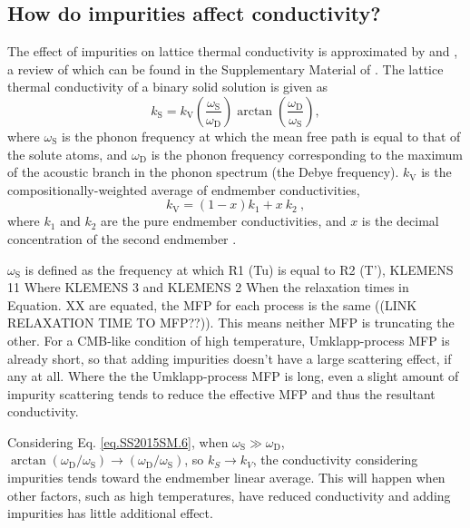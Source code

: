 \subsection{How do impurities affect conductivity?} 
\label{impur_theory}

The effect of impurities on lattice thermal conductivity is approximated by \citet{Klemens1960} and \citet{Padture1997}, a review of which can be found in the Supplementary Material of \citet{Stackhouse2015}. The lattice thermal conductivity of a binary solid solution is given \citep[in][Eq. S6]{Stackhouse2015} as
%
\begin{equation}
k_{\mathrm{S}}=k_{\mathrm{V}}\left ( \frac{\omega_{\mathrm{S}}}{\omega_{\mathrm{D}}} \right )\arctan \left ( \frac{\omega_{\mathrm{D}}}{\omega_{\mathrm{S}}} \right ),
\label{eq.SS2015SM.6}
\end{equation}
%
where $\omega_{\mathrm{S}}$ is the phonon frequency at which the mean free path is equal to that of the solute atoms, and $\omega_{\mathrm{D}}$ is the phonon frequency corresponding to the maximum of the acoustic branch in the phonon spectrum (the Debye frequency). $k_{\mathrm{V}}$ is the compositionally-weighted average of endmember conductivities, 
%
\begin{equation}
k_{\mathrm{V}}=\left ( 1-x \right )k_{1} + x\ k_{2} \ ,
\label{eq.SS2015SM.7}
\end{equation}
%
where $k_{\mathrm{1}}$ and $k_{\mathrm{2}}$ are the pure endmember conductivities, and $x$ is the decimal concentration of the second endmember \citep[][Eq. S7]{Stackhouse2015}.

$\omega_{\mathrm{S}}$ is defined as the frequency at which R1 (Tu) is equal to R2 (T'),
KLEMENS 11
Where
KLEMENS 3
and
KLEMENS 2
When the relaxation times in Equation. XX are equated, the MFP for each process is the same ((LINK RELAXATION TIME TO MFP??)). This means neither MFP is truncating the other. For a CMB-like condition of high temperature, Umklapp-process MFP is already short, so that adding impurities doesn't have a large scattering effect, if any at all. Where the the Umklapp-process MFP is long, even a slight amount of impurity scattering tends to reduce the effective MFP and thus the resultant conductivity.

Considering Eq. \ref{eq.SS2015SM.6}, when $\omega_{\mathrm{S}} \gg \omega_{\mathrm{D}}$, $\arctan(\omega_{\mathrm{D}}/\omega_{\mathrm{S}}) \rightarrow (\omega_{\mathrm{D}}/\omega_{\mathrm{S}})$, so $k_{S} \rightarrow k_{V}$, the conductivity considering impurities tends toward the endmember linear average. This will happen when other factors, such as high temperatures, have reduced conductivity and adding impurities has little additional effect.

